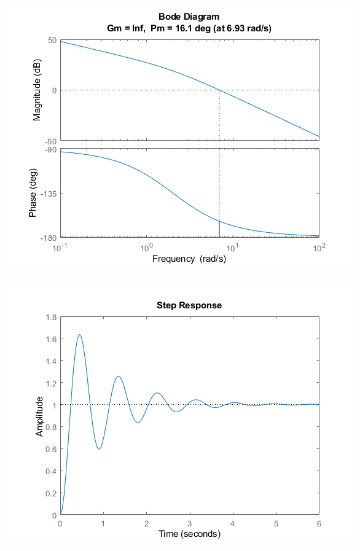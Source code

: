 \documentclass{layout}
\begin{document}
\begin{figure}[H]
    \centering
    \begin{subfigure}[b]{0.49\textwidth}
        \centering
        \includegraphics[width=\textwidth]{images/figure1.png}
    \end{subfigure}
    \hfill
    \begin{subfigure}[b]{0.49\textwidth}
        \centering
        \includegraphics[width=\textwidth]{images/figure2.png}
    \end{subfigure}
\end{figure}
\end{document}
